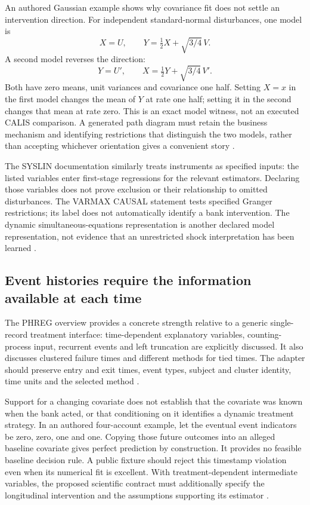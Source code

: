 An authored Gaussian example shows why covariance fit does not settle an
intervention direction. For independent standard-normal disturbances, one
model is
\[
 X=U,\qquad Y=\tfrac12X+\sqrt{3/4}\,V.
\]
A second model reverses the direction:
\[
 Y=U',\qquad X=\tfrac12Y+\sqrt{3/4}\,V'.
\]
Both have zero means, unit variances and covariance one half. Setting $X=x$
in the first model changes the mean of $Y$ at rate one half; setting it in
the second changes that mean at rate zero. This is an exact model witness,
not an executed CALIS comparison. A generated path diagram must retain the
business mechanism and identifying restrictions that distinguish the two
models, rather than accepting whichever orientation gives a convenient
story \citep{exec24_sas_choice}.

The SYSLIN documentation similarly treats instruments as specified inputs:
the listed variables enter first-stage regressions for the relevant
estimators. Declaring those variables does not prove exclusion or their
relationship to omitted disturbances. The VARMAX CAUSAL statement tests
specified Granger restrictions; its label does not automatically identify
a bank intervention. The dynamic simultaneous-equations representation is
another declared model representation, not evidence that an unrestricted
shock interpretation has been learned
\citep{exec13_ivrd_sas,exec13_ct_sas_causal,exec13_ct_sas_structural}.

\subsection{Event histories require the information available at each time}
The PHREG overview provides a concrete strength relative to a generic
single-record treatment interface: time-dependent explanatory variables,
counting-process input, recurrent events and left truncation are explicitly
discussed. It also discusses clustered failure times and different methods
for tied times. The adapter should preserve entry and exit times, event
types, subject and cluster identity, time units and the selected method
\citep{exec14_survival_sas}.

Support for a changing covariate does not establish that the covariate was
known when the bank acted, or that conditioning on it identifies a dynamic
treatment strategy. In an authored four-account example, let the eventual
event indicators be zero, zero, one and one. Copying those future outcomes
into an alleged baseline covariate gives perfect prediction by construction.
It provides no feasible baseline decision rule. A public fixture should
reject this timestamp violation even when its numerical fit is excellent.
With treatment-dependent intermediate variables, the proposed scientific
contract must additionally specify the longitudinal intervention and the
assumptions supporting its estimator
\citep{exec24_sas_choice}.

